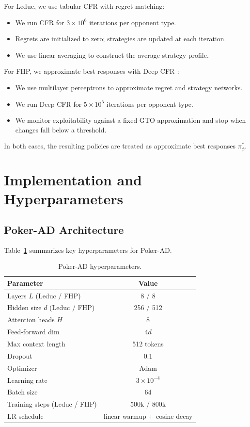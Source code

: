 \documentclass{article}
\begin{document}
For Leduc, we use tabular CFR with regret matching:
\begin{itemize}[leftmargin=*]
    \item We run CFR for $3 \times 10^{6}$ iterations per opponent type.
    \item Regrets are initialized to zero; strategies are updated at each iteration.
    \item We use linear averaging to construct the average strategy profile.
\end{itemize}
For FHP, we approximate best responses with Deep CFR~\citep{brown2019deepcfr}:
\begin{itemize}[leftmargin=*]
    \item We use multilayer perceptrons to approximate regret and strategy networks.
    \item We run Deep CFR for $5 \times 10^{5}$ iterations per opponent type.
    \item We monitor exploitability against a fixed GTO approximation and stop when changes fall below a threshold.
\end{itemize}

In both cases, the resulting policies are treated as approximate best responses $\pi^*_{\phi}$.

\section{Implementation and Hyperparameters}
\label{app:impl}

\subsection{Poker-AD Architecture}

Table~\ref{tab:hyperparams} summarizes key hyperparameters for Poker-AD.

\begin{table}[h]
    \centering
    \caption{Poker-AD hyperparameters.}
    \label{tab:hyperparams}
    \begin{tabular}{lc}
        \toprule
        Parameter & Value \\
        \midrule
        Layers $L$ (Leduc / FHP) & 8 / 8 \\
        Hidden size $d$ (Leduc / FHP) & 256 / 512 \\
        Attention heads $H$ & 8 \\
        Feed-forward dim & 4$d$ \\
        Max context length & 512 tokens \\
        Dropout & 0.1 \\
        Optimizer & Adam \\
        Learning rate & $3 \times 10^{-4}$ \\
        Batch size & 64 \\
        Training steps (Leduc / FHP) & 500k / 800k \\
        LR schedule & linear warmup + cosine decay \\
        \bottomrule
    \end{tabular}
\end{table}
\end{document}
